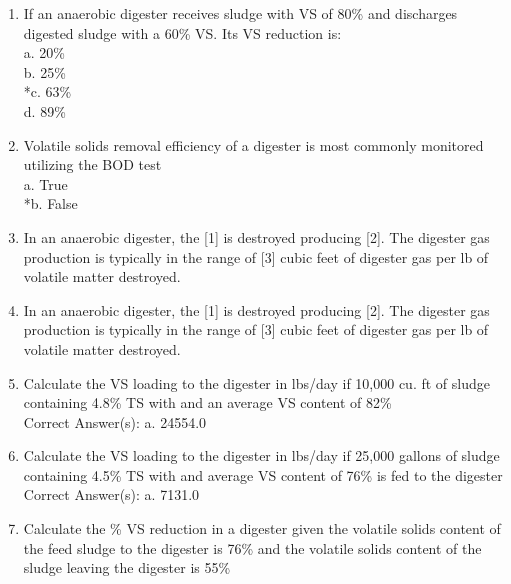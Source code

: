 \documentclass{article}
\begin{document}
\begin{enumerate}
\item  If an anaerobic digester receives sludge with VS of 80\% and discharges digested sludge with a 60\% VS.  Its VS reduction is:\\

a. 20\% \\
b. 25\% \\
*c. 63\% \\
d. 89\% \\

\item  Volatile solids removal efficiency of a digester is most commonly monitored utilizing the BOD test\\

a. True \\
*b. False \\

\item  In an anaerobic digester, the [1] is destroyed producing [2].  The digester gas production is typically in the range of [3] cubic feet of digester gas per lb of volatile matter destroyed. \\

\item  In an anaerobic digester, the [1] is destroyed producing [2].  The digester gas production is typically in the range of [3] cubic feet of digester gas per lb of volatile matter destroyed. \\

\item  Calculate the VS loading to the digester in lbs/day if 10,000 cu. ft of sludge containing 4.8\% TS with and an average VS content of 82\% \\

Correct Answer(s):
a. 24554.0 \\

\item  Calculate the VS loading to the digester in lbs/day if 25,000 gallons of sludge containing 4.5\% TS with and average VS content of 76\% is fed to the digester \\

Correct Answer(s):
a. 7131.0 \\

\item  Calculate the \% VS reduction in a digester given the volatile solids content of the feed sludge to the digester is 76\% and the volatile solids content of the sludge leaving the digester is 55\% \\


\end{enumerate}
\end{document}
